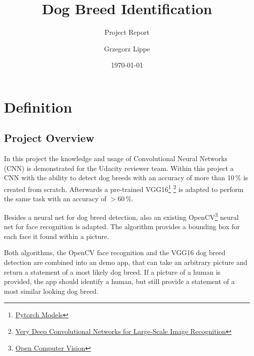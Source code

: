 \documentclass[paper=A4, DIV=10, parskip=half]{scrartcl}
\title{Dog Breed Identification}
\subtitle{Project Report}
\author{Grzegorz Lippe}
\date{\today}
\begin{document}
\maketitle


  
\section*{Definition}

\subsection*{Project Overview}

In this project the knowledge and usage of Convolutional Neural Networks (CNN)
is demonstrated for the Udacity reviewer team. Within this project a CNN with
the ability to detect dog breeds with an accuracy of more than 10\,\% is created
from scratch. Afterwards a pre-trained
VGG16\footnote{\href{https://pytorch.org/vision/0.8/models.html}{Pytorch Models}}
\footnote{\href{https://arxiv.org/abs/1409.1556}{Very Deep Convolutional
Networks for Large-Scale Image Recognition}} is adapted to perform the same task
with an accuracy of $>$60\,\%.

Besides a neural net for dog breed detection, also an existing
OpenCV\footnote{\href{https://opencv.org/}{Open Computer Vision}} neural net for
face recognition is adapted. The algorithm provides a bounding box for each face
it found within a picture.

Both algorithms, the OpenCV face recognition and the VGG16 dog breed detection
are combined into an demo app, that can take an arbitrary picture and return a
statement of a most likely dog breed. If a picture of a human is provided, the
app should identify a human, but still provide a statement of a most similar
looking dog breed.

\end{document}
